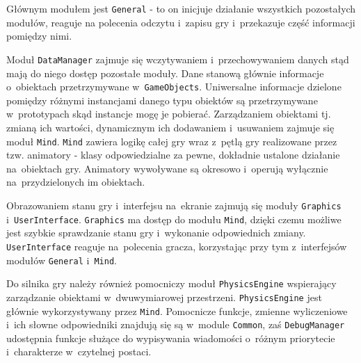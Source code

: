 \documentclass[licencjacka]{pracamgr}
\begin{document}
    Głównym modułem jest \texttt{General} - to on inicjuje działanie wszystkich pozostałych modułów, reaguje na
    polecenia odczytu i~zapisu gry i~przekazuje część informacji pomiędzy nimi.

    Moduł \texttt{DataManager} zajmuje się
    wczytywaniem i~przechowywaniem danych stąd mają do niego dostęp pozostałe moduły. Dane stanową głównie informacje
    o~obiektach przetrzymywane w~\texttt{GameObjects}. Uniwersalne informacje dzielone pomiędzy różnymi instancjami danego
    typu obiektów są przetrzymywane w~prototypach skąd instancje mogę je pobierać. Zarządzaniem obiektami tj. zmianą ich wartości,
    dynamicznym ich dodawaniem i~usuwaniem zajmuje się moduł \texttt{Mind}. \texttt{Mind} zawiera logikę całej gry wraz z~pętlą gry
    realizowane przez tzw. animatory - klasy odpowiedzialne za pewne, dokładnie ustalone działanie na~obiektach gry.
    Animatory wywoływane są okresowo i~operują wyłącznie na~przydzielonych im obiektach.

    Obrazowaniem stanu gry i~interfejsu na~ekranie zajmują się moduły \texttt{Graphics} i~\texttt{UserInterface}.
    \texttt{Graphics} ma dostęp do modułu \texttt{Mind}, dzięki czemu możliwe jest szybkie sprawdzanie stanu
    gry i~wykonanie odpowiednich zmiany. \texttt{UserInterface} reaguje na~polecenia gracza, korzystając przy tym z~interfejsów modułów
    \texttt{General} i~\texttt{Mind}.

    Do silnika gry należy również pomocniczy moduł \texttt{PhysicsEngine} wspierający zarządzanie obiektami w~dwuwymiarowej przestrzeni.
    \texttt{PhysicsEngine} jest głównie wykorzystywany przez \texttt{Mind}. Pomocnicze funkcje, zmienne wyliczeniowe i~ich słowne 
    odpowiedniki znajdują się są w~module \texttt{Common}, zaś \texttt{DebugManager} udostępnia funkcje służące do wypisywania wiadomości
    o~różnym priorytecie i~charakterze w~czytelnej postaci.
\end{document}
